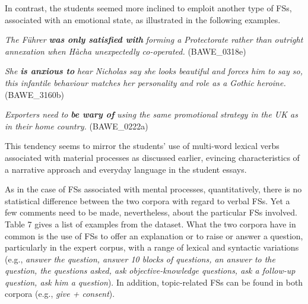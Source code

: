 \begin{styleStandard}
In contrast, the students seemed more inclined to emploit another type of FSs, associated with an emotional state, as illustrated in the following examples. 
\end{styleStandard}

\begin{listWWNumxxixleveli}
\item 
\begin{styleListParagraph}
\textit{The Führer }\textbf{\textit{was only satisfied with}}\textit{ forming a Protectorate rather than outright annexation when Hàcha unexpectedly co-operated. }(BAWE\_0318e)
\end{styleListParagraph}
\item 
\begin{styleListParagraph}
\textit{She }\textbf{\textit{is anxious to}}\textit{ hear Nicholas say she looks beautiful and forces him to say so, this infantile behaviour matches her personality and role as a Gothic heroine. }(BAWE\_3160b)
\end{styleListParagraph}
\item 
\begin{styleListParagraph}
\textit{Exporters need to }\textbf{\textit{be wary of}}\textit{ using the same promotional strategy in the UK as in their home country. }(BAWE\_0222a)
\end{styleListParagraph}
\end{listWWNumxxixleveli}
\begin{styleStandard}
This tendency seems to mirror the students’ use of multi-word lexical verbs associated with material processes as discussed earlier, evincing characteristics of a narrative approach and everyday language in the student essays.
\end{styleStandard}

\begin{styleStandard}
As in the case of FSs associated with mental processes, quantitatively, there is no statistical difference between the two corpora with regard to verbal FSs. Yet a few comments need to be made, nevertheless, about the particular FSs involved. Table 7 gives a list of examples from the dataset. What the two corpora have in common is the use of FSs to offer an explanation or to raise or answer a question, particularly in the expert corpus, with a range of lexical and syntactic variations (e.g., \textit{answer the question, answer 10 blocks of questions, an answer to the question, the questions asked, ask objective-knowledge questions, ask a follow-up question, ask him a question}). In addition, topic-related FSs can be found in both corpora (e.g., \textit{give + consent}). 
\end{styleStandard}

